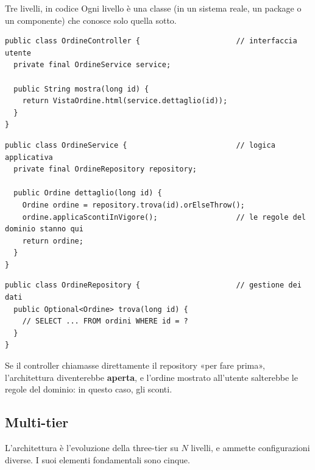 \begin{esempio}{Tre livelli, in codice}
Ogni livello è una classe (in un sistema reale, un package o un componente) che conosce solo quella sotto.
\begin{lstlisting}[style=java, name=OrdineController.java]
public class OrdineController {                      // interfaccia utente
  private final OrdineService service;

  public String mostra(long id) {
    return VistaOrdine.html(service.dettaglio(id));
  }
}
\end{lstlisting}
\begin{lstlisting}[style=java, name=OrdineService.java]
public class OrdineService {                         // logica applicativa
  private final OrdineRepository repository;

  public Ordine dettaglio(long id) {
    Ordine ordine = repository.trova(id).orElseThrow();
    ordine.applicaScontiInVigore();                  // le regole del dominio stanno qui
    return ordine;
  }
}
\end{lstlisting}
\begin{lstlisting}[style=java, name=OrdineRepository.java]
public class OrdineRepository {                      // gestione dei dati
  public Optional<Ordine> trova(long id) {
    // SELECT ... FROM ordini WHERE id = ?
  }
}
\end{lstlisting}
Se il controller chiamasse direttamente il repository «per fare prima», l'architettura diventerebbe \textbf{aperta}, e
l'ordine mostrato all'utente salterebbe le regole del dominio: in questo caso, gli sconti.
\end{esempio}

\subsection{Multi-tier}

L'architettura  è l'evoluzione della three-tier su $N$ livelli, e ammette configurazioni diverse. I suoi
elementi fondamentali sono cinque.


